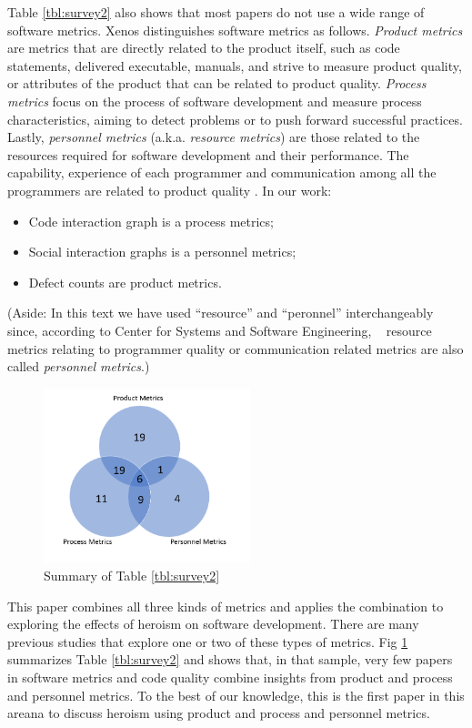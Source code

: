 \documentclass[sigconf,review]{acmart}
\newcommand{\bi}{\begin{itemize}}
\newcommand{\ei}{\end{itemize}}
\begin{document}
Table \ref{tbl:survey2} also shows that most papers
do not use  a wide range of software metrics.
 Xenos \cite{Xenos} distinguishes software metrics as  follows.
 {\em Product metrics} are metrics that are directly related to the product itself, such as code statements, delivered executable, manuals, and strive to measure product quality, or attributes of the product that can be related to product quality.  
 {\em Process metrics} focus on the process of software development and measure process characteristics, aiming to
detect problems or to push forward successful practices.  
Lastly,  {\em personnel metrics} (a.k.a. {\em resource metrics})
are those related to the resources required for software development and their performance. The capability, experience of each programmer and communication among all the programmers are related to product quality \cite{wolf2009predicting,de2004sometimes,cataldo2013coordination,cataldo2007coordination}. 
 In our work:
 \bi
 \item   Code interaction graph  is a  process metrics;
 \item Social interaction graphs is a personnel  metrics;
 \item Defect counts are product metrics.
\ei
(Aside: In this text we have used ``resource'' and ``peronnel'' interchangeably  since, according to Center for Systems and Software Engineering, ~\cite{Xenos} resource metrics relating to programmer quality or communication related metrics are also called {\em personnel metrics}.)



\begin{figure}[!t]
\begin{center}\includegraphics[width=6cm]{Venn.png}\end{center}
\caption{Summary of Table \ref{tbl:survey2}}
\label{fig:venn}
\end{figure}
 
This paper combines all  three kinds of metrics and applies the combination to exploring the effects of heroism on software development. There are many previous studies that explore one or two of these types of metrics.
Fig \ref{fig:venn} summarizes Table \ref{tbl:survey2} and shows that,
in that sample, very few papers in software metrics and code quality
combine insights from product and process and personnel metrics. 
To the best of our knowledge, this is the first paper in this areana
to discuss
heroism using   product and process and personnel metrics.   
\end{document}
